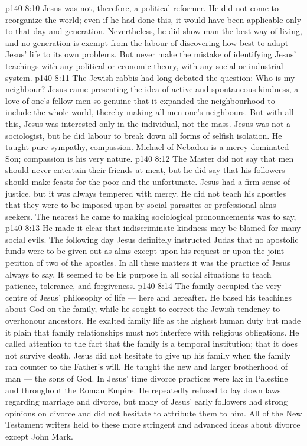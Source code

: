 \vs p140 8:10 Jesus was not, therefore, a political reformer. He did not come to reorganize the world; even if he had done this, it would have been applicable only to that day and generation. Nevertheless, he did show man the best way of living, and no generation is exempt from the labour of discovering how best to adapt Jesus’ life to its own problems. But never make the mistake of identifying Jesus’ teachings with any political or economic theory, with any social or industrial system.
\vs p140 8:11 \bibnobreakspace {} The Jewish rabbis had long debated the question: Who is my neighbour? Jesus came presenting the idea of active and spontaneous kindness, a love of one’s fellow men so genuine that it expanded the neighbourhood to include the whole world, thereby making all men one’s neighbours. But with all this, Jesus was interested only in the individual, not the mass. Jesus was not a sociologist, but he did labour to break down all forms of selfish isolation. He taught pure sympathy, compassion. Michael of Nebadon is a mercy\hyp{}dominated Son; compassion is his very nature.
\vs p140 8:12 The Master did not say that men should never entertain their friends at meat, but he did say that his followers should make feasts for the poor and the unfortunate. Jesus had a firm sense of justice, but it was always tempered with mercy. He did not teach his apostles that they were to be imposed upon by social parasites or professional alms\hyp{}seekers. The nearest he came to making sociological pronouncements was to say, 
\vs p140 8:13 He made it clear that indiscriminate kindness may be blamed for many social evils. The following day Jesus definitely instructed Judas that no apostolic funds were to be given out as alms except upon his request or upon the joint petition of two of the apostles. In all these matters it was the practice of Jesus always to say,  It seemed to be his purpose in all social situations to teach patience, tolerance, and forgiveness.
\vs p140 8:14 The family occupied the very centre of Jesus’ philosophy of life --- here and hereafter. He based his teachings about God on the family, while he sought to correct the Jewish tendency to overhonour ancestors. He exalted family life as the highest human duty but made it plain that family relationships must not interfere with religious obligations. He called attention to the fact that the family is a temporal institution; that it does not survive death. Jesus did not hesitate to give up his family when the family ran counter to the Father’s will. He taught the new and larger brotherhood of man --- the sons of God. In Jesus’ time divorce practices were lax in Palestine and throughout the Roman Empire. He repeatedly refused to lay down laws regarding marriage and divorce, but many of Jesus’ early followers had strong opinions on divorce and did not hesitate to attribute them to him. All of the New Testament writers held to these more stringent and advanced ideas about divorce except John Mark.
